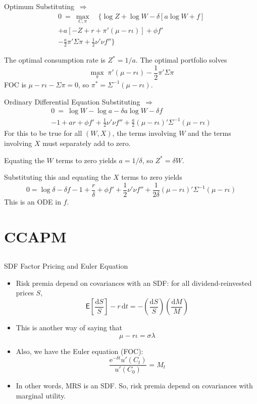 \documentclass[10pt]{beamer}
\newcommand{\bi}{\begin{itemize}}
\newcommand{\ei}{\end{itemize}}
\newcommand{\im}{\item}
\newcommand{\D}{\mathrm{d}}
\newcommand{\E}{\mathrm{e}}
\newcommand{\mye}{\ensuremath{\mathsf{E}}}
\begin{document}
\begin{frame}{Optimum}
Substituting $\,\Rightarrow$
\begin{multline*} 0 \ = \ \max_{C,\pi} \quad \bigg\{\log Z + \log W - \delta [a \log W + f] \\ + a[-Z + r + \pi'(\mu - r\iota)] + \phi f'\\ 
- \frac{a}{2}\pi'\Sigma\pi  + \frac{1}{2}\nu'\nu f'' \bigg\}
\end{multline*}

The optimal consumption rate is $Z^*=1/a$.  The optimal portfolio solves
$$\max_\pi \; \pi'(\mu-r\iota) - \frac{1}{2}\pi'\Sigma\pi$$
FOC is $\mu-r\iota - \Sigma\pi=0$, so $\pi^* = \Sigma^{-1}(\mu-r\iota)$.

\end{frame}

\begin{frame}{Ordinary Differential Equation}
Substituting $\,\Rightarrow$
\begin{multline*} 0 \ = \ \log W - \log a - \delta a \log W - \delta f \\ 
-1 + ar + \phi f' + \frac{1}{2}\nu'\nu f'' +
 \frac{a}{2}(\mu - r\iota)'\Sigma^{-1}(\mu - r\iota) 
\end{multline*}
For this to be true for all $(W,X)$, the terms involving $W$ and the terms involving $X$ must separately add to zero.  

Equating the $W$ terms to zero yields $a = 1/\delta$, so $Z^* = \delta W$.  

Substituting this and equating the $X$ terms to zero yields
$$ 0= \log \delta - \delta f - 1 + \frac{r}{\delta} + \phi f' +  \frac{1}{2}\nu'\nu f'' +
 \frac{1}{2\delta}(\mu - r\iota)'\Sigma^{-1}(\mu - r\iota) 
$$
This is an ODE in $f$.
\end{frame}


\section{CCAPM}\subsection{}

\begin{frame}{SDF Factor Pricing and Euler Equation}
  \bi 
\im Risk premia depend on covariances with an SDF: for all dividend-reinvested prices $S$,
$$\mye\left[\frac{\D S}{S}\right] -r\,\D t= - \left(\frac{\D S}{S}\right)\left(\frac{\D M}{M}\right)$$
\im This is another way of saying that
$$\mu - r\iota = \sigma\lambda$$
\im Also, we have the Euler equation (FOC):
$$\frac{\E^{-\delta t}u'(C_t)}{u'(C_0)} = M_t$$
\im In other words, MRS is an SDF.  So, risk premia depend on covariances with marginal utility.
\ei
\end{frame}
\end{document}
